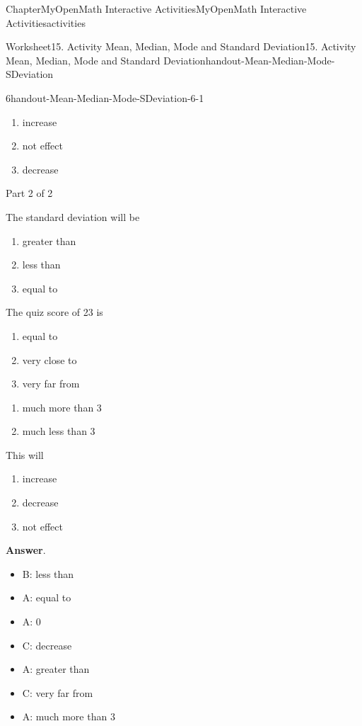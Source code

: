 \documentclass[oneside,10pt,]{book}
\newcommand{\blocktitlefont}{\relax}
\newcommand{\ptxlistdisc}{\raisebox{0.3ex}{\textbullet}}
\begin{document}
\begin{chapterptx}{Chapter}{MyOpenMath Interactive Activities}{}{MyOpenMath Interactive Activities}{}{}{activities}
\begin{worksheet-section}{Worksheet}{15. Activity Mean, Median, Mode and Standard Deviation}{}{15. Activity Mean, Median, Mode and Standard Deviation}{}{}{handout-Mean-Median-Mode-SDeviation}
\begin{divisionexercise}{6}{}{}{handout-Mean-Median-Mode-SDeviation-6-1}
%
\begin{enumerate}[label={(\alph*)}]
\item{}increase%
\item{}not effect%
\item{}decrease%
\end{enumerate}
%
\par
Part 2 of 2%
\par
The standard deviation will be%
\par
%
\begin{enumerate}[label={(\alph*)}]
\item{}greater than%
\item{}less than%
\item{}equal to%
\end{enumerate}
%
\par
The quiz score of 23 is%
\par
%
\begin{enumerate}[label={(\alph*)}]
\item{}equal to%
\item{}very close to%
\item{}very far from%
\end{enumerate}
%
\par
%
\begin{enumerate}[label={(\alph*)}]
\item{}much more than 3%
\item{}much less than 3%
\end{enumerate}
%
\par
This will%
\par
%
\begin{enumerate}[label={(\alph*)}]
\item{}increase%
\item{}decrease%
\item{}not effect%
\end{enumerate}
%
\par\smallskip%
\noindent\textbf{\blocktitlefont Answer}.\hypertarget{handout-Mean-Median-Mode-SDeviation-6-1-2}{}\quad{}%
\begin{itemize}[label=\ptxlistdisc]
\item{}B: less than%
\item{}A: equal to%
\item{}A: 0%
\item{}C: decrease%
\item{}A: greater than%
\item{}C: very far from%
\item{}A: much more than 3%

\end{itemize}
\end{divisionexercise}
\end{worksheet-section}
\end{chapterptx}
\end{document}
